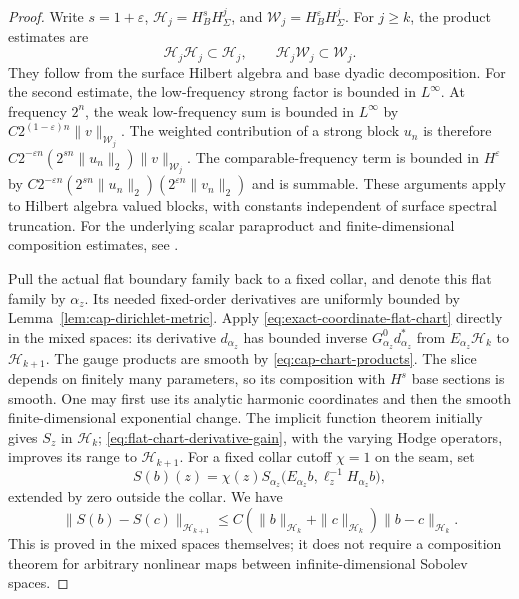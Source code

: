 \documentclass[11pt]{amsart}
\theoremstyle{definition}
\theoremstyle{remark}
\theoremstyle{plain}
\begin{document}
\begin{proof}
Write $s=1+\varepsilon$, $\mathcal H_j=H_B^sH_\Sigma^j$,
and $\mathcal W_j=H_B^\varepsilon H_\Sigma^j$.
For $j\geq k$, the product estimates are
\begin{equation}\label{eq:cap-chart-products}
 \mathcal H_j\mathcal H_j\subset\mathcal H_j,\qquad
 \mathcal H_j\mathcal W_j\subset\mathcal W_j.
\end{equation}
They follow from the surface Hilbert algebra and base dyadic
decomposition. For the second estimate, the low-frequency
strong factor is bounded in $L^\infty$. At frequency $2^n$,
the weak low-frequency sum is bounded in $L^\infty$ by
$C2^{(1-\varepsilon)n}\|v\|_{\mathcal W_j}$.
The weighted contribution of a strong block $u_n$ is therefore
$C2^{-\varepsilon n}(2^{sn}\|u_n\|_2)\|v\|_{\mathcal W_j}$.
The comparable-frequency term is bounded in $H^\varepsilon$
by $C2^{-\varepsilon n}(2^{sn}\|u_n\|_2)
(2^{\varepsilon n}\|v_n\|_2)$ and is summable.
These arguments apply to Hilbert algebra valued blocks, with
constants independent of surface spectral truncation.
For the underlying scalar paraproduct and finite-dimensional
composition estimates, see
\cite[\S\S3.1, 3.5, especially (3.1.20) and (3.5.1)--(3.5.13)]
{Taylor91}.

Pull the actual flat boundary family back to a fixed collar,
and denote this flat family by $\alpha_z$. Its needed fixed-order
derivatives are uniformly bounded by
Lemma~\ref{lem:cap-dirichlet-metric}.
Apply \eqref{eq:exact-coordinate-flat-chart} directly in the
mixed spaces: its derivative $d_{\alpha_z}$ has bounded inverse
$G^0_{\alpha_z}d_{\alpha_z}^*$ from
$E_{\alpha_z}\mathcal H_k$ to $\mathcal H_{k+1}$.
The gauge products are smooth by \eqref{eq:cap-chart-products}.
The slice depends on finitely many parameters, so its composition
with $H^s$ base sections is smooth. One may first use its analytic
harmonic coordinates and then the smooth finite-dimensional
exponential change. The implicit function theorem initially
gives $S_z$ in $\mathcal H_k$;
\eqref{eq:flat-chart-derivative-gain}, with the varying Hodge
operators, improves its range to $\mathcal H_{k+1}$.
For a fixed collar cutoff $\chi=1$ on the seam, set
\[
 S(b)(z)=\chi(z)S_{\alpha_z}
       \bigl(E_{\alpha_z}b,\ell_z^{-1}H_{\alpha_z}b\bigr),
\]
extended by zero outside the collar. We have
\begin{equation}\label{eq:cap-chart-smoothing}
 \|S(b)-S(c)\|_{\mathcal H_{k+1}}
 \leq C(\|b\|_{\mathcal H_k}+\|c\|_{\mathcal H_k})
                         \|b-c\|_{\mathcal H_k}.
\end{equation}
This is proved in the mixed spaces themselves; it does not
require a composition theorem for arbitrary nonlinear maps
between infinite-dimensional Sobolev spaces.


\end{proof}
\end{document}
